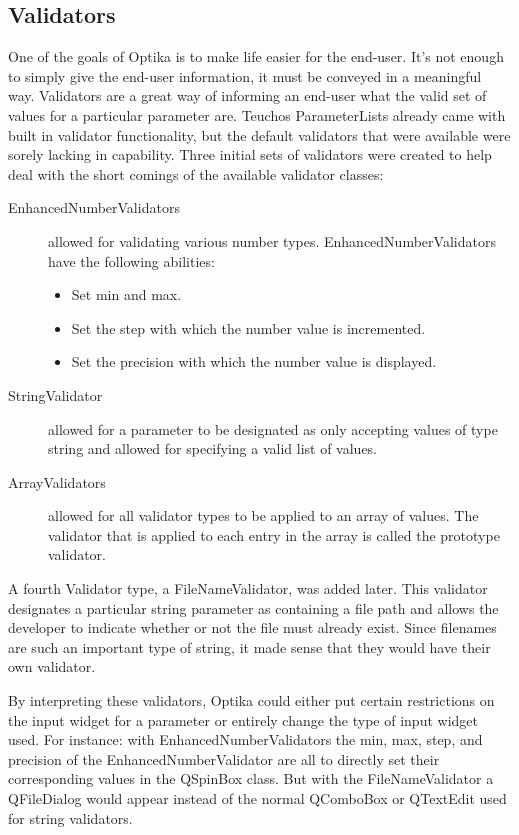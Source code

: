 	\subsection{Validators}
	One of the goals of Optika is to make life easier for the end-user. It's not enough to simply give the end-user information, it must
	be conveyed in a meaningful way. Validators are a great way of informing an end-user what the valid set of values for a particular parameter are.
	Teuchos ParameterLists already came with built in validator functionality, but the default validators that were available
	were sorely lacking in capability. Three initial sets of validators were created to help deal with the short comings of
	the available validator classes:
	\begin{description}
		\item[EnhancedNumberValidators] allowed for validating various number types. EnhancedNumberValidators have the following abilities:
			\begin{itemize}
				\item Set min and max.
				\item Set the step with which the number value is incremented.
				\item Set the precision with which the number value is displayed.
			\end{itemize}
		\item[StringValidator] allowed for a parameter to be designated as only accepting values of type string
		and allowed for specifying a valid list of values.
		\item[ArrayValidators] allowed for all validator types to be applied to an array of values. The validator
		that is applied to each entry in the array is called the prototype validator.
	\end{description}
	A fourth Validator type, a FileNameValidator, was added later. This validator designates a particular string parameter
	as containing a file path and allows the developer to indicate whether or not the file must already exist. Since filenames
	are such an important type of string, it made sense that they would have their own validator.
	
	By interpreting these validators, Optika could either put certain restrictions on the input widget for a parameter or entirely change the
	type of input widget used. For instance: with EnhancedNumberValidators the min, max, step, and precision of the
	EnhancedNumberValidator are all to directly set their corresponding values in the QSpinBox class. But with the FileNameValidator
	a QFileDialog would appear instead of the normal QComboBox or QTextEdit used for string validators.

